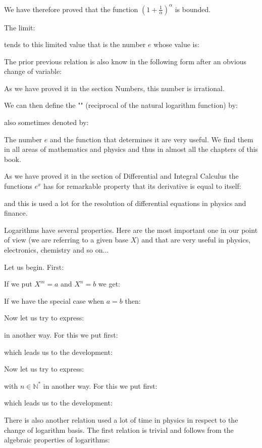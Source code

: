 	We have therefore proved that the function $\left(1+\frac{1}{\alpha}\right)^\alpha$ is bounded.
	
	The limit:
	
	tends to this limited value that is the number $e$ whose value is:
	
	The prior previous relation is also know in the following form after an obvious change of variable:
	
	\begin{tcolorbox}[title=Remark,colframe=black,arc=10pt]
	As we have proved it in the section Numbers, this number is irrational.
	\end{tcolorbox}
	We can then define the "" (reciprocal of the natural logarithm function) by:
	
	also sometimes denoted by:
	
	The number $e$ and the function that determines it are very useful. We find them in all areas of mathematics and physics and thus in almost all the chapters of this book.
	
	As we have proved it in the section of Differential and Integral Calculus the functions $e^x$ has for remarkable property that its derivative is equal to itself:
	
	and this is used a lot for the resolution of differential equations in physics and finance.
	
	Logarithms have several properties. Here are the most important one in our point of view (we are referring to a given base $X$) and that are very useful in physics, electronics, chemistry and so on...
	
	Let us begin. First:
	
	If we put $X^m=a$ and $X^n=b$ we get:
	
	If we have the special case when $a=b$ then:
	
	Now let us try to express:
	
	in another way. For this we put first:
	
	which leads us to the development:
	
	Now let us try to express:
	
	with $n\in \mathbb{N}^{*}$ in another way. For this we put first:
	
	which leads us to the development:
	
	There is  also another relation used a lot of time in physics in respect to the change of logarithm basis. The first relation is trivial and follows from the algebraic properties of logarithms:
	
